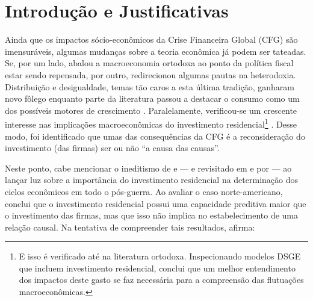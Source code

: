 \section{Introdução e Justificativas}\label{Intro}



Ainda que os impactos sócio-econômicos da Crise Financeira Global (CFG) são imensuráveis, algumas mudanças sobre a teoria econômica já podem ser tateadas. Se, por um lado, abalou a macroeconomia ortodoxa ao ponto da política fiscal estar sendo repensada, por outro, redirecionou algumas pautas na heterodoxia. Distribuição e desigualdade, temas tão caros a esta última tradição, ganharam novo fôlego \cites{carvalho_personal_2016}{ederer_will_2019} enquanto parte da literatura passou a destacar o consumo como um dos possíveis motores de crescimento \cite{brochier_macroeconomics_2017}. Paralelamente, verificou-se um crescente interesse nas implicações macroeconômicas do investimento residencial\footnote{E isso é verificado até na literatura ortodoxa. Inspecionando modelos DSGE que incluem investimento residencial, \textcite{iacoviello_housing_2010} conclui que um melhor entendimento dos impactos deste gasto se faz necessária para a compreensão das flutuações macroeconômicas. } \cite{fiebiger_semi-autonomous_2018}. Desse modo, foi identificado que umas das consequências da CFG é a reconsideração do investimento (das firmas) ser ou não  ``a causa das causas''.

Neste ponto, cabe mencionar o ineditismo de \textcite{green_follow_1997} e \textcite{leamer_housing_2007} --- e revisitado em \textcite{leamer_housing_2015} e por \textcite{fiebiger_trend_2017} --- ao lançar luz sobre a importância do investimento residencial na determinação dos ciclos econômicos em todo o pós-guerra. Ao avaliar o caso norte-americano, \textcite{green_follow_1997} conclui que o investimento residencial possui uma capacidade preditiva maior que o investimento das firmas, mas que isso não implica no estabelecimento de uma relação causal. Na tentativa de compreender tais resultados, afirma:


